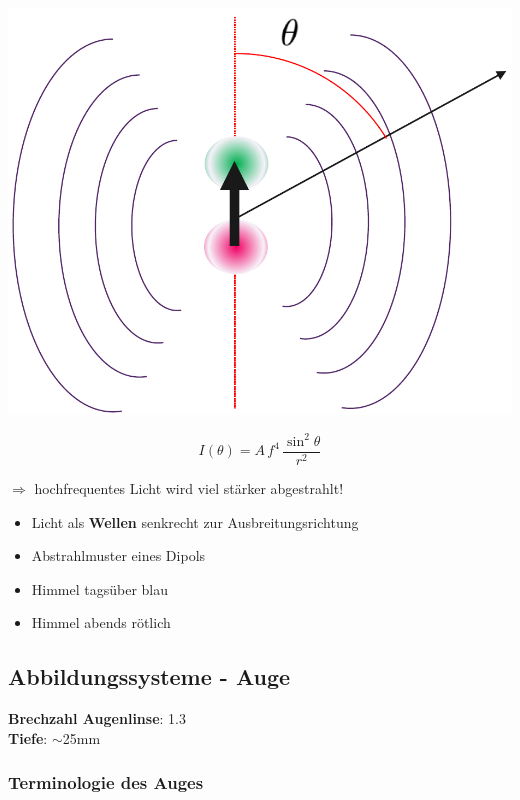 \begin{minipage}{0.38\linewidth}
\includegraphics[width=0.9\linewidth]{Bilder/Wellen-Optik/rayleigh_streuung}
\end{minipage}
\hfill
\begin{minipage}{0.58\linewidth}
$$ \boxed{ I(\theta) = A \, f^4 \, \frac{\sin^2 \theta}{r^2} } $$

$\Rightarrow$ hochfrequentes Licht wird viel stärker abgestrahlt! \\

\begin{itemize}

\item Licht als \textbf{Wellen} senkrecht 
	zur Ausbreitungsrichtung 
\item Abstrahlmuster eines Dipols \\
\item Himmel tagsüber blau 
\item Himmel abends rötlich	  

\end{itemize}

\end{minipage}


\subsection{Abbildungssysteme - Auge}

\textbf{Brechzahl Augenlinse}: 1.3\\
\textbf{Tiefe}: $\sim$25mm

\subsubsection{Terminologie des Auges}

